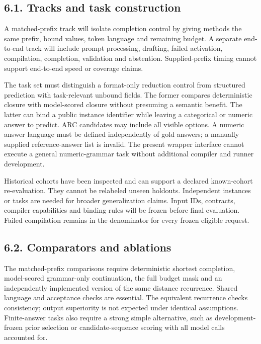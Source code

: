 \documentclass[
  12pt,
  a4paper,
]{article}
\begin{document}
\subsection{6.1. Tracks and task
construction}\label{tracks-and-task-construction}

A matched-prefix track will isolate completion control by giving methods
the same prefix, bound values, token language and remaining budget. A
separate end-to-end track will include prompt processing, drafting,
failed activation, compilation, completion, validation and abstention.
Supplied-prefix timing cannot support end-to-end speed or coverage
claims.

The task set must distinguish a format-only reduction control from
structured prediction with task-relevant unbound fields. The former
compares deterministic closure with model-scored closure without
presuming a semantic benefit. The latter can bind a public instance
identifier while leaving a categorical or numeric answer to predict. ARC
candidates may include all visible options. A numeric answer language
must be defined independently of gold answers; a manually supplied
reference-answer list is invalid. The present wrapper interface cannot
execute a general numeric-grammar task without additional compiler and
runner development.

Historical cohorts have been inspected and can support a declared
known-cohort re-evaluation. They cannot be relabeled unseen holdouts.
Independent instances or tasks are needed for broader generalization
claims. Input IDs, contracts, compiler capabilities and binding rules
will be frozen before final evaluation. Failed compilation remains in
the denominator for every frozen eligible request.

\subsection{6.2. Comparators and
ablations}\label{comparators-and-ablations}

The matched-prefix comparisons require deterministic shortest
completion, model-scored grammar-only continuation, the full budget mask
and an independently implemented version of the same distance
recurrence. Shared language and acceptance checks are essential. The
equivalent recurrence checks consistency; output superiority is not
expected under identical assumptions. Finite-answer tasks also require a
strong simple alternative, such as development-frozen prior selection or
candidate-sequence scoring with all model calls accounted for.
\end{document}
